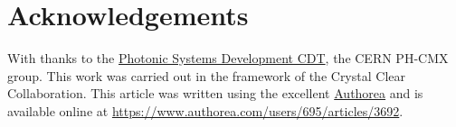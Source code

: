 \section*{Acknowledgements}
With thanks to the \href{https://www.photonicsystems.org/}{Photonic Systems Development CDT}, the CERN PH-CMX group. This work was carried out in the framework of the Crystal Clear Collaboration. This article was written using the excellent \href{www.authorea.com}{Authorea} and is available online at \href{https://www.authorea.com/users/695/articles/3692}{https://www.authorea.com/users/695/articles/3692}.